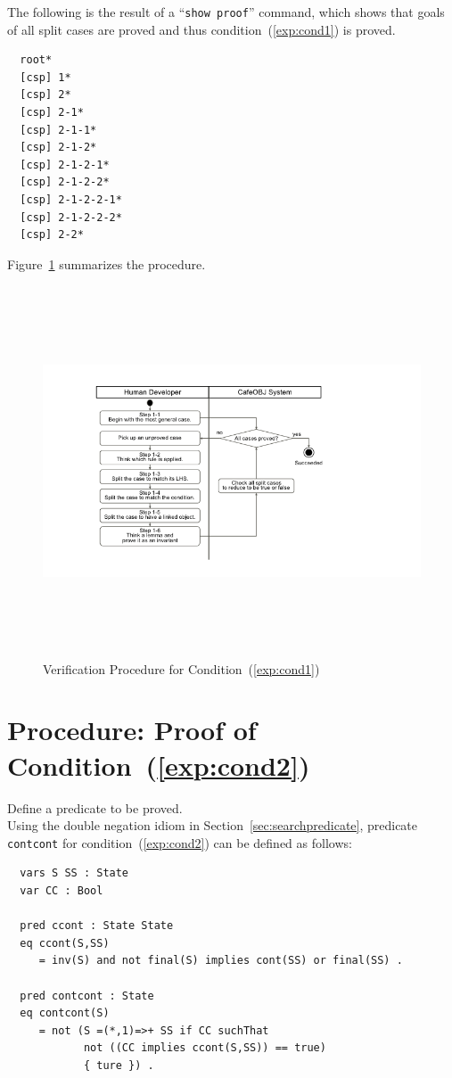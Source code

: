 \documentclass[12pt]{report}
\newcommand{\stt}[1]{{\small{\tt {#1}}}}
\begin{document}
The following is the result of a ``\stt{show proof}'' command, which shows
that goals of all split cases are proved and thus
condition~(\ref{exp:cond1}) is proved.
\small
\begin{verbatim}
  root*
  [csp] 1*
  [csp] 2*
  [csp] 2-1*
  [csp] 2-1-1*
  [csp] 2-1-2*
  [csp] 2-1-2-1*
  [csp] 2-1-2-2*
  [csp] 2-1-2-2-1*
  [csp] 2-1-2-2-2*
  [csp] 2-2*
\end{verbatim}
\normalsize

Figure~\ref{fig:procedure1} summarizes the procedure.
\begin{figure}
\centering
\includegraphics[height=11cm,natwidth=720,natheight=405,clip,trim=100 55 190 40]{procedure1.png}
\caption{Verification Procedure for Condition~(\ref{exp:cond1})}
\label{fig:procedure1}
\end{figure}

\section{Procedure: Proof of Condition~(\ref{exp:cond2})}
\label{sec:contcont}
 Define a predicate to be proved. \\ Using the
double negation idiom in Section~\ref{sec:searchpredicate}, predicate
{\tt contcont} for condition~(\ref{exp:cond2}) can be defined as follows:
\small
\begin{verbatim}
  vars S SS : State
  var CC : Bool

  pred ccont : State State
  eq ccont(S,SS)
     = inv(S) and not final(S) implies cont(SS) or final(SS) .

  pred contcont : State
  eq contcont(S)
     = not (S =(*,1)=>+ SS if CC suchThat
            not ((CC implies ccont(S,SS)) == true)
            { ture }) .
\end{verbatim}
\normalsize
\end{document}
